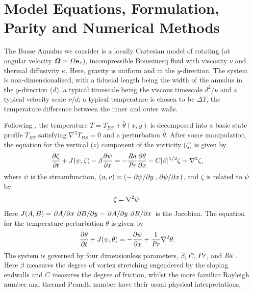 \documentclass{jfm}
\newcommand{\Rayleigh}{\mbox{\textit{Ra}}}  %
\begin{document}
\section{Model Equations, Formulation, Parity and Numerical Methods}
\label{sec:model-eqations}


The Busse Annulus we consider  is a locally Cartesian model of rotating (at angular velocity ${\boldsymbol \Omega = \Omega {\bf e}_z}$), incompressible Boussinesq fluid with viscosity $\nu$ and thermal diffusivity $\kappa$. Here, gravity is uniform and in the $y$-direction. 
The system is non-dimensionalised, with a fiducial length being the width of the annulus in the $y$-direction ($d$), a typical timescale being the viscous timescale $d^2/\nu$ and a typical velocity scale $\nu/d$; a typical temperature is chosen to be $\Delta T$, the temperature difference between the inner and outer walls. 

Following \citet{bh1993, rj2006}, 
the temperature  $T = T_{BS} +{\hat \theta(x,y)}$ is decomposed into a basic state profile $T_{BS}$ satisfying $\nabla^2 T_{BS} = 0$ and a perturbation ${\hat \theta}$. 
After some manipulation, the equation for the vertical ($z$) component of the vorticity ($\zeta$) is given by
\begin{equation}
  \label{eq:zeta_eom}
  \pdv{\zeta}{t} + J(\psi, \zeta) - \beta \pdv{\psi}{x} = -\frac{\Rayleigh}{\Pran} \pdv{\theta}{x} -C |\beta|^{1/2} \zeta + \laplacian{\zeta},
\end{equation}
where $\psi$ is the streamfunction, $(u,v) = (-\pdv*{\psi}{y}, \pdv*{\psi}{x})$, and $\zeta$ is related to $\psi$ by
\begin{equation}
  \label{eq:zeta_def}
  \zeta = \laplacian{\psi}.
\end{equation}
Here $J(A, B) = \pdv*{A}{x}\pdv*{B}{y} - \pdv*{A}{y}\pdv*{B}{x}$ is the Jacobian. 
The equation for the temperature perturbation  $\theta$ is given by
%
\begin{equation}
  \label{eq:theta}
  \pdv{\theta}{t} + J(\psi, \theta) = -\pdv{\psi}{x} + \frac{1}{\Pran} \nabla^2 \theta.
\end{equation}
The system is governed by four dimensionless parameters, $\beta$, $C$, $\Pran$, and $\Rayleigh$ \citep[see e.g.][for the definition of these parameters]{tom_2018}. Here $\beta$ measures the degree of vortex stretching engendered by the sloping endwalls and $C$ measures the degree of friction, whilst the more familiar Rayleigh number and thermal Prandtl number have their usual physical interpretations.
\end{document}
